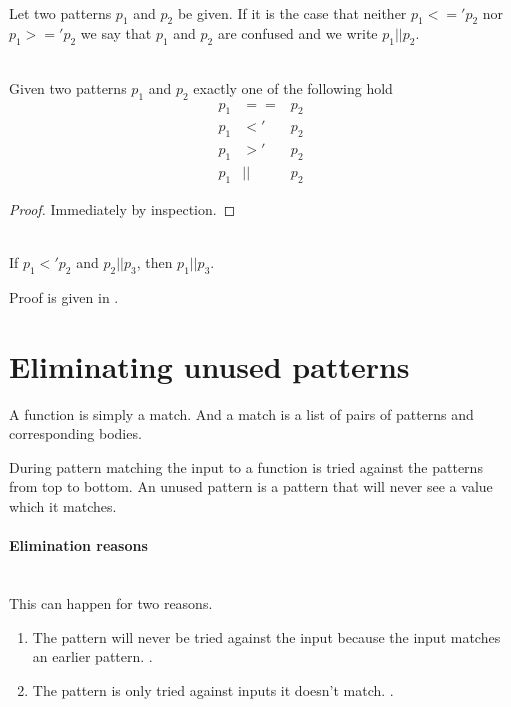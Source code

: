 \begin{definition}[Confusion, $||$]\ \\
  \label{def:pat-confusion}
  Let two patterns $p_1$ and $p_2$ be given. If it is the case that neither $p_1
  <=' p_2$ nor $p_1 >=' p_2$ we say that $p_1$ and $p_2$ are confused and we
  write $p_1 || p_2$.
\end{definition}

\begin{lemma}\ \\
  \label{lem:unique-rel}
  Given two patterns $p_1$ and $p_2$ exactly one of the following hold
  \begin{eqnarray*}
    p_1 &==& p_2\\
    p_1 &<'& p_2\\
    p_1 &>'& p_2\\
    p_1 &||& p_2
  \end{eqnarray*}
\end{lemma}
\begin{proof}
  Immediately by inspection.
\end{proof}

\begin{lemma}[]\ \\
  \label{lem:more-specific-confused}
  If $p_1 <' p_2$ and $p_2 || p_3$, then $p_1 || p_3$.

  Proof is given in .
\end{lemma}


\section{Eliminating unused patterns}
A function is simply a match. And a match is a list of pairs of patterns and
corresponding bodies.

During pattern matching the input to a function is tried against the patterns
from top to bottom. An unused pattern is a pattern that will never see a value
which it matches.

\paragraph{Elimination reasons}\ \\
This can happen for two reasons.
\begin{enumerate}
\item The pattern will never be tried against the input because the input
  matches an earlier pattern. \label{item:unused-reason-1}.
\item The pattern is only tried against inputs it doesn't
  match. \label{item:unused-reason-2}.
\end{enumerate}


